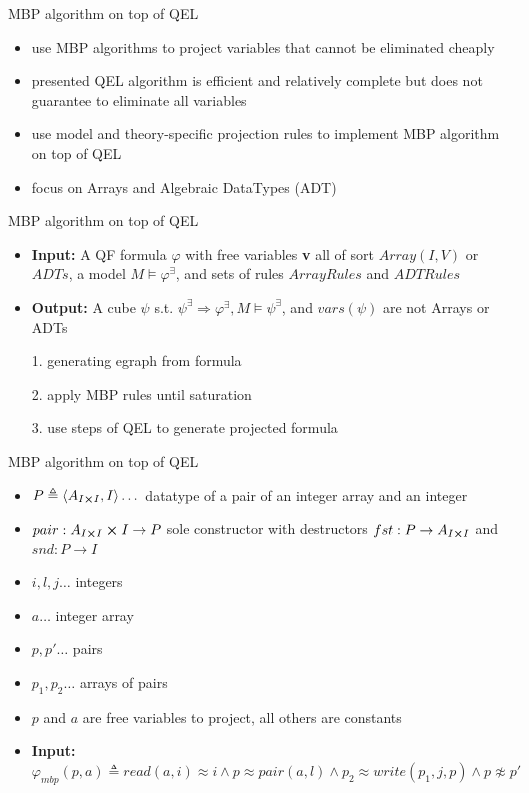 \documentclass{beamer}
\begin{document}
\begin{frame}{MBP algorithm on top of QEL}
\begin{itemize}
  \item use MBP algorithms to project variables that cannot be eliminated cheaply
  \pause
  \item presented QEL algorithm is efficient and relatively complete but does not guarantee to eliminate all variables
  \pause
  \item use model and theory-specific projection rules to implement MBP algorithm on top of QEL
  \pause
  \item focus on Arrays and Algebraic DataTypes (ADT)
\end{itemize}
\end{frame}

\begin{frame}{MBP algorithm on top of QEL}

\begin{itemize}
    \item \textbf{Input:} A QF formula $\varphi$ with free variables \textbf{v} all of sort $Array(I,V)$ or $ADTs$, a model $M \vDash \varphi^{\exists}$, and sets of rules $ArrayRules$ and $ADTRules$
    \item  \textbf{Output:} A cube $\psi$ s.t. $\psi^{\exists} \Rightarrow \varphi^{\exists}, M \vDash \psi^{\exists}$, and $vars(\psi)$ are not Arrays or ADTs
    \pause
    \item[1.] generating egraph from formula
    \item[2.] apply MBP rules until saturation
    \item[3.] use steps of QEL to generate projected formula
\end{itemize}

\end{frame}

\begin{frame}{MBP algorithm on top of QEL}
\begin{itemize}
    \item $P \triangleq \langle A_{I \cross I}, I \rangle \dots$ datatype of a pair of an integer array and an integer
    \item $pair : A_{I \cross I} \cross I \rightarrow P$ sole constructor with destructors $fst : P \rightarrow A_{I \cross I}$ and $snd : P \rightarrow I$
    \item $i,l,j \dots$ integers
    \item $a \dots$ integer array
    \item $p,p' \dots$ pairs
    \item $p_1,p_2 \dots$ arrays of pairs
    \item $p$ and $a$ are free variables to project, all others are constants
    \item \textbf{Input:} 
    $\varphi_{mbp}(p,a) \triangleq read(a,i) \approx i \land p \approx pair(a,l) \land p_2 \approx write(p_1, j, p) \land p \not\approx p'$
\end{itemize}

\end{frame}
\end{document}
